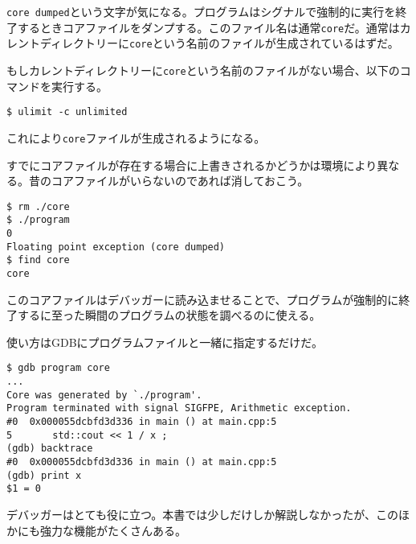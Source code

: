 \texttt{core dumped}という文字が気になる。プログラムはシグナルで強制的に実行を終了するときコアファイルをダンプする。このファイル名は通常\texttt{core}だ。通常はカレントディレクトリーに\texttt{core}という名前のファイルが生成されているはずだ。

もしカレントディレクトリーに\texttt{core}という名前のファイルがない場合、以下のコマンドを実行する。

\begin{lstlisting}[style=terminal]
$ ulimit -c unlimited
\end{lstlisting}

これにより\texttt{core}ファイルが生成されるようになる。

すでにコアファイルが存在する場合に上書きされるかどうかは環境により異なる。昔のコアファイルがいらないのであれば消しておこう。

\begin{lstlisting}[style=terminal]
$ rm ./core
$ ./program
0
Floating point exception (core dumped)
$ find core
core
\end{lstlisting}

このコアファイルはデバッガーに読み込ませることで、プログラムが強制的に終了するに至った瞬間のプログラムの状態を調べるのに使える。

使い方はGDBにプログラムファイルと一緒に指定するだけだ。

\begin{lstlisting}[style=terminal]
$ gdb program core
...
Core was generated by `./program'.
Program terminated with signal SIGFPE, Arithmetic exception.
#0  0x000055dcbfd3d336 in main () at main.cpp:5
5       std::cout << 1 / x ;
(gdb) backtrace
#0  0x000055dcbfd3d336 in main () at main.cpp:5
(gdb) print x
$1 = 0
\end{lstlisting}

デバッガーはとても役に立つ。本書では少しだけしか解説しなかったが、このほかにも強力な機能がたくさんある。
